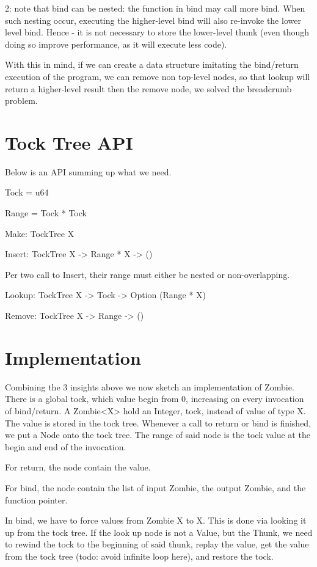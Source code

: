 \documentclass[acmsmall]{acmart}
\begin{document}
	2: note that bind can be nested: the function in bind may call more bind. When such nesting occur, executing the higher-level bind will also re-invoke the lower level bind. Hence - it is not necessary to store the lower-level thunk (even though doing so improve performance, as it will execute less code).
	
	With this in mind, if we can create a data structure imitating the bind/return execution of the program, we can remove non top-level nodes, so that lookup will return a higher-level result then the remove node, we solved the breadcrumb problem.
	
	\section{Tock Tree API}
	Below is an API summing up what we need.

	Tock = u64

	Range = Tock * Tock

	Make: TockTree X

	Insert: TockTree X -> Range * X -> ()

	Per two call to Insert, their range must either be nested or non-overlapping.

	Lookup: TockTree X -> Tock -> Option (Range * X)

	Remove: TockTree X -> Range -> ()

	\section{Implementation}
	Combining the 3 insights above we now sketch an implementation of Zombie.
	There is a global tock, which value begin from 0, increasing on every invocation of bind/return.
	A Zombie<X> hold an Integer, tock, instead of value of type X.
	The value is stored in the tock tree.
	Whenever a call to return or bind is finished, we put a Node onto the tock tree.
	The range of said node is the tock value at the begin and end of the invocation.
	
	For return, the node contain the value.
	
	For bind, the node contain the list of input Zombie, the output Zombie, and the function pointer.
	
	In bind, we have to force values from Zombie X to X. This is done via looking it up from the tock tree. If the look up node is not a Value, but the Thunk, we need to rewind the tock to the beginning of said thunk, replay the value, get the value from the tock tree (todo: avoid infinite loop here), and restore the tock.
	
\end{document}
